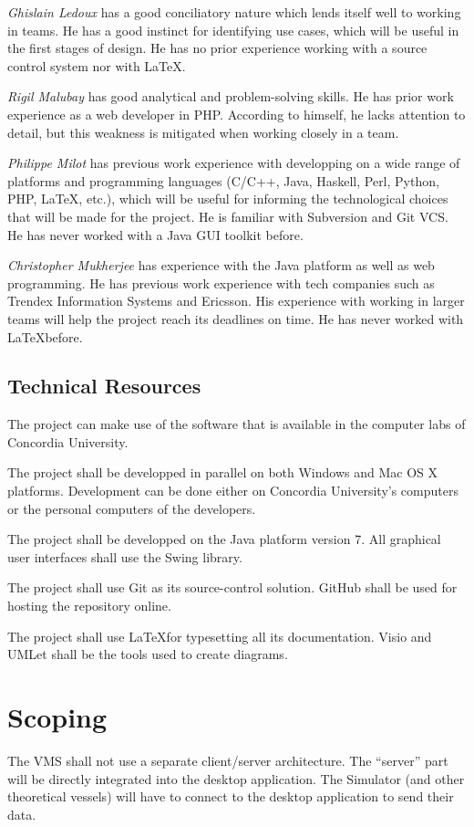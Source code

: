 \documentclass{article}
\begin{document}
\emph{Ghislain Ledoux} has a good conciliatory nature which lends itself well to working in teams. He has a good instinct for identifying use cases, which will be useful in the first stages of design. He has no prior experience working with a source control system nor with \LaTeX.

\emph{Rigil Malubay} has good analytical and problem-solving skills. He has prior work experience as a web developer in PHP. According to himself, he lacks attention to detail, but this weakness is mitigated when working closely in a team.

\emph{Philippe Milot} has previous work experience with developping on a wide range of platforms and programming languages (C/C++, Java, Haskell, Perl, Python, PHP, \LaTeX, etc.), which will be useful for informing the technological choices that will be made for the project. He is familiar with Subversion and Git VCS. He has never worked with a Java GUI toolkit before.

\emph{Christopher Mukherjee} has experience with the Java platform as well as web programming. He has previous work experience with tech companies such as Trendex Information Systems and Ericsson. His experience with working in larger teams will help the project reach its deadlines on time. He has never worked with \LaTeX before.

\subsection{Technical Resources} %

The project can make use of the software that is available in the computer labs of Concordia University. 

The project shall be developped in parallel on both Windows and Mac OS X platforms. Development can be done either on Concordia University's computers or the personal computers of the developers.

The project shall be developped on the Java platform version 7. All graphical user interfaces shall use the Swing library.

The project shall use Git as its source-control solution. GitHub shall be used for hosting the repository online.

The project shall use \LaTeX for typesetting all its documentation. Visio and UMLet shall be the tools used to create diagrams.

\section{Scoping} %
The VMS shall not use a separate client/server architecture. The ``server'' part will be directly integrated into the desktop application. The Simulator (and other theoretical vessels) will have to connect to the desktop application to send their data.
\end{document}
